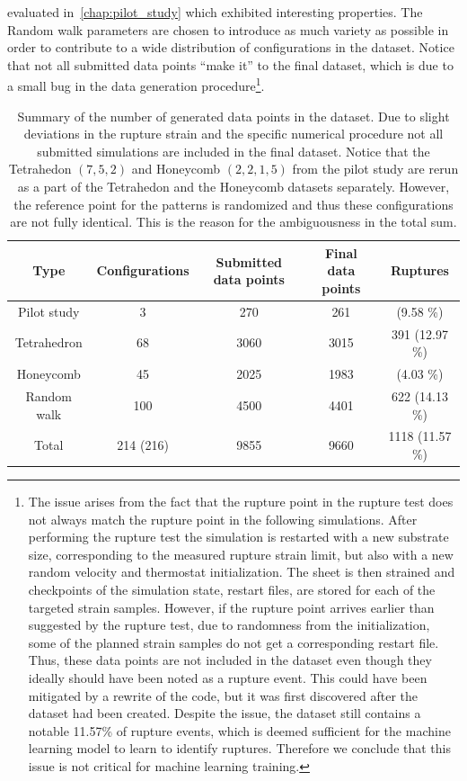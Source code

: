 evaluated in~\cref{chap:pilot_study} which exhibited interesting properties. The
Random walk parameters are chosen to introduce as much
variety as possible in order to contribute to a wide distribution of configurations in the dataset. Notice that not all
submitted data points ``make it'' to the final dataset, which is due to a small
bug in the data generation procedure\footnote{The issue arises from the fact
that the rupture point in the rupture test does not always match the rupture
point in the following simulations. After performing the rupture test the
simulation is restarted with a new substrate size, corresponding to the measured
rupture strain limit, but also with a new random velocity and thermostat
initialization. The sheet is then strained and checkpoints of the simulation
state, restart files, are stored for each of the targeted strain samples.
However, if the rupture point arrives earlier than suggested by the rupture
test, due to randomness from the initialization, some of the planned strain
samples do not get a corresponding restart file. Thus, these data points are
not included in the dataset even though they ideally should have been noted as a
rupture event. This could have been mitigated by a rewrite of the code, but it
was first discovered after the dataset had been created. Despite the issue, the
dataset still contains a notable 11.57\% of rupture events, which is deemed
sufficient for the machine learning model to learn to identify ruptures.
Therefore we conclude that this issue is not critical for machine learning
training.}.


\begin{table}[!htb]
  \begin{center}
  \caption{Summary of the number of generated data points in the dataset. Due to slight deviations in the rupture strain and the specific numerical procedure not all submitted simulations are included in the final dataset. Notice that the Tetrahedon $(7, 5, 2)$ and Honeycomb $(2, 2, 1, 5)$ from the pilot study are rerun as a part of the Tetrahedon and the Honeycomb datasets separately. However, the reference point for the patterns is randomized and thus these configurations are not fully identical. This is the reason for the ambiguousness in the total sum.}
  \label{tab:dataset_summary}
  \begin{tabular}{ | c | c | c | c | c |} \hline
  \textbf{Type} & \textbf{Configurations} & \textbf{Submitted data points} & \textbf{Final data points} & \textbf{Ruptures} \\ \hline
  Pilot study & 3 & 270 & 261 & \: 25 \: (9.58 \%)\\ \hline
  Tetrahedron & 68 & 3060 & 3015 & 391 (12.97 \%)\\ \hline
  Honeycomb & 45 & 2025 & 1983 & \: 80 \: (4.03 \%)\\ \hline
  Random walk & 100 & 4500 & 4401 & 622 (14.13 \%) \\ \Xhline{2\arrayrulewidth}
  Total & 214 (216) & 9855 & 9660 & 1118 (11.57 \%) \\ \hline
  \end{tabular}
  \end{center}
\end{table}


